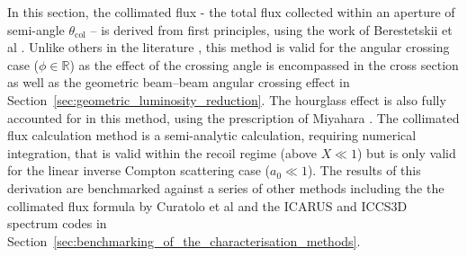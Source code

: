 \documentclass[../main.tex]{subfiles}
\begin{document}
In this section, the collimated flux - the total flux collected within an aperture of semi-angle $\theta_{\mathrm{col}}$ -- is derived from first principles, using the work of Berestetskii et al \cite{berestetskii1982quantum}. Unlike others in the literature \cite{curatolo2017analytical}, this method is valid for the angular crossing case ($\phi\in\mathbb{R}$) as the effect of the crossing angle is encompassed in the cross section as well as the geometric beam--beam angular crossing effect in Section~\ref{sec:geometric_luminosity_reduction}. The hourglass effect is also fully accounted for in this method, using the prescription of Miyahara \cite{miyahara2008luminosity}. The collimated flux calculation method is a semi-analytic calculation, requiring numerical integration, that is valid within the recoil regime (above $X\ll1$) but is only valid for the linear inverse Compton scattering case ($a_{0}\ll1$). The results of this derivation are benchmarked against a series of other methods including the the collimated flux formula by Curatolo et al \cite{curatolo2017analytical} and the \textsc{ICARUS} and \textsc{ICCS3D} spectrum codes in Section~\ref{sec:benchmarking_of_the_characterisation_methods}.
\end{document}
